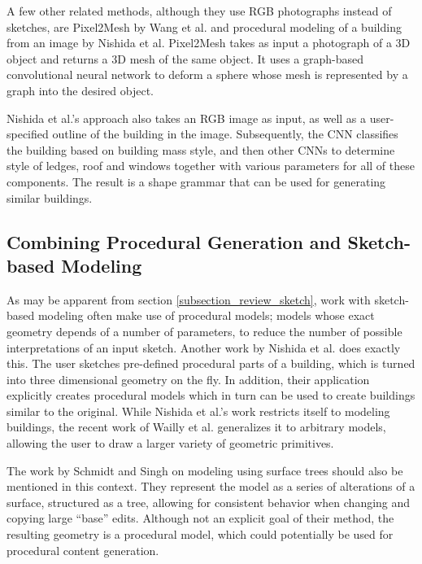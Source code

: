 \documentclass[english]{article}
\begin{document}
A few other related methods, although they use RGB photographs instead of sketches, are Pixel2Mesh \cite{pixel2mesh} by Wang et al. and procedural modeling of a building from an image \cite{procedural_building_from_image} by Nishida et al. Pixel2Mesh takes as input a photograph of a 3D object and returns a 3D mesh of the same object. It uses a graph-based convolutional neural network to deform a sphere whose mesh is represented by a graph into the desired object.

Nishida et al.'s approach also takes an RGB image as input, as well as a user-specified outline of the building in the image. Subsequently, the CNN classifies the building based on building mass style, and then other CNNs to determine style of ledges, roof and windows together with various parameters for all of these components. The result is a shape grammar that can be used for generating similar buildings.

\subsection{Combining Procedural Generation and Sketch-based Modeling}

As may be apparent from section \ref{subsection_review_sketch}, work with sketch-based modeling often make use of procedural models; models whose exact geometry depends of a number of parameters, to reduce the number of possible interpretations of an input sketch. Another work by Nishida et al. \cite{sketch_based_urban_modeling} does exactly this. The user sketches pre-defined procedural parts of a building, which is turned into three dimensional geometry on the fly. In addition, their application explicitly creates procedural models which in turn can be used to create buildings similar to the original. While Nishida et al.'s work restricts itself to modeling buildings, the recent work of Wailly et al. \cite{sketching_parameterized_models} generalizes it to arbitrary models, allowing the user to draw a larger variety of geometric primitives.

The work by Schmidt and Singh \cite{schmidt08} on modeling using surface trees should also be mentioned in this context. They represent the model as a series of alterations of a surface, structured as a tree, allowing for consistent behavior when changing and copying large ``base'' edits. Although not an explicit goal of their method, the resulting geometry is a procedural model, which could potentially be used for procedural content generation.
\end{document}
